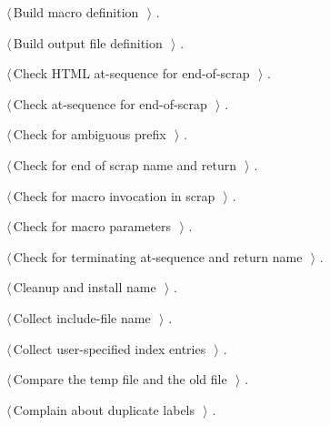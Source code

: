 \documentclass{report}
\begin{document}
{\begin{list}{}{\setlength{\itemsep}{-\parsep}\setlength{\itemindent}{-\leftmargin}}
\item $\langle\,$Build macro definition\nobreak\ {\footnotesize {}}$\,\rangle$ {\footnotesize {\NWtxtRefIn} .}
\item $\langle\,$Build output file definition\nobreak\ {\footnotesize {}}$\,\rangle$ {\footnotesize {\NWtxtRefIn} .}
\item $\langle\,$Check HTML at-sequence for end-of-scrap\nobreak\ {\footnotesize {}}$\,\rangle$ {\footnotesize {\NWtxtRefIn} .}
\item $\langle\,$Check at-sequence for end-of-scrap\nobreak\ {\footnotesize {}}$\,\rangle$ {\footnotesize {\NWtxtRefIn} .}
\item $\langle\,$Check for ambiguous prefix\nobreak\ {\footnotesize {}}$\,\rangle$ {\footnotesize {\NWtxtRefIn} .}
\item $\langle\,$Check for end of scrap name and return\nobreak\ {\footnotesize {}}$\,\rangle$ {\footnotesize {\NWtxtRefIn} .}
\item $\langle\,$Check for macro invocation in scrap\nobreak\ {\footnotesize {}}$\,\rangle$ {\footnotesize {\NWtxtRefIn} .}
\item $\langle\,$Check for macro parameters\nobreak\ {\footnotesize {}}$\,\rangle$ {\footnotesize {\NWtxtRefIn} .}
\item $\langle\,$Check for terminating at-sequence and return name\nobreak\ {\footnotesize {}}$\,\rangle$ {\footnotesize {\NWtxtRefIn} .}
\item $\langle\,$Cleanup and install name\nobreak\ {\footnotesize {}}$\,\rangle$ {\footnotesize {\NWtxtRefIn} .
}
\item $\langle\,$Collect include-file name\nobreak\ {\footnotesize {}}$\,\rangle$ {\footnotesize {\NWtxtRefIn} .}
\item $\langle\,$Collect user-specified index entries\nobreak\ {\footnotesize {}}$\,\rangle$ {\footnotesize {\NWtxtRefIn} .}
\item $\langle\,$Compare the temp file and the old file\nobreak\ {\footnotesize {}}$\,\rangle$ {\footnotesize {\NWtxtRefIn} .}
\item $\langle\,$Complain about duplicate labels\nobreak\ {\footnotesize {}}$\,\rangle$ {\footnotesize {\NWtxtRefIn} .}

\end{list}}
\end{document}
